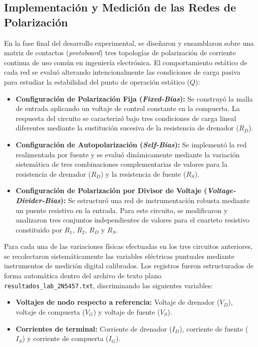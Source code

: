 \documentclass[conference]{IEEEtran}
\begin{document}
\subsection{Implementación y Medición de las Redes de Polarización}
En la fase final del desarrollo experimental, se diseñaron y ensamblaron sobre
una matriz de contactos (\textit{protoboard}) tres topologías de polarización
de corriente continua de uso común en ingeniería electrónica. El comportamiento
estático de cada red se evaluó alterando intencionalmente las condiciones de
carga pasiva para estudiar la estabilidad del punto de operación estático
($Q$):

\begin{itemize}
    \item \textbf{Configuración de Polarización Fija (\textit{Fixed-Bias}):} Se construyó la malla de entrada aplicando un voltaje de control constante en la compuerta. La respuesta del circuito se caracterizó bajo tres condiciones de carga lineal diferentes mediante la sustitución sucesiva de la resistencia de drenador ($R_D$).
    \item \textbf{Configuración de Autopolarización (\textit{Self-Bias}):} Se implementó la red realimentada por fuente y se evaluó dinámicamente mediante la variación sistemática de tres combinaciones complementarias de valores para la resistencia de drenador ($R_D$) y la resistencia de fuente ($R_S$).
    \item \textbf{Configuración de Polarización por Divisor de Voltaje (\textit{Voltage-Divider-Bias}):} Se estructuró una red de instrumentación robusta mediante un puente resistivo en la entrada. Para este circuito, se modificaron y analizaron tres conjuntos independientes de valores para el cuarteto resistivo constituido por $R_1$, $R_2$, $R_D$ y $R_S$.
\end{itemize}

Para cada una de las variaciones físicas efectuadas en los tres circuitos
anteriores, se recolectaron sistemáticamente las variables eléctricas puntuales
mediante instrumentos de medición digital calibrados. Los registros fueron
estructurados de forma automática dentro del archivo de texto plano
\texttt{resultados\_lab\_2N5457.txt}, discriminando las siguientes variables:
\begin{itemize}
    \item \textbf{Voltajes de nodo respecto a referencia:} Voltaje de drenador ($V_D$), voltaje de compuerta ($V_G$) y voltaje de fuente ($V_S$).
    \item \textbf{Corrientes de terminal:} Corriente de drenador ($I_D$), corriente de fuente ($I_S$) y corriente de compuerta ($I_G$).
\end{itemize}
\end{document}
